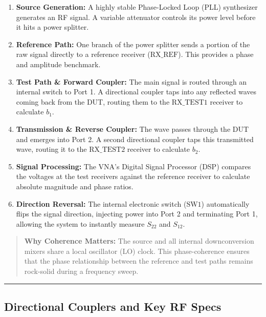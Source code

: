 \documentclass[
]{article}
\providecommand{\tightlist}{%
  \setlength{\itemsep}{0pt}\setlength{\parskip}{0pt}}
\begin{document}
\begin{enumerate}
\def\labelenumi{\arabic{enumi}.}
\tightlist
\item
  \textbf{Source Generation:} A highly stable Phase-Locked Loop (PLL)
  synthesizer generates an RF signal. A variable attenuator controls its
  power level before it hits a power splitter.
\item
  \textbf{Reference Path:} One branch of the power splitter sends a
  portion of the raw signal directly to a reference receiver
  (\(\text{RX\_REF}\)). This provides a phase and amplitude benchmark.
\item
  \textbf{Test Path \& Forward Coupler:} The main signal is routed
  through an internal switch to Port 1. A directional coupler taps into
  any reflected waves coming back from the DUT, routing them to the
  \(\text{RX\_TEST1}\) receiver to calculate \(b_1\).
\item
  \textbf{Transmission \& Reverse Coupler:} The wave passes through the
  DUT and emerges into Port 2. A second directional coupler taps this
  transmitted wave, routing it to the \(\text{RX\_TEST2}\) receiver to
  calculate \(b_2\).
\item
  \textbf{Signal Processing:} The VNA's Digital Signal Processor (DSP)
  compares the voltages at the test receivers against the reference
  receiver to calculate absolute magnitude and phase ratios.
\item
  \textbf{Direction Reversal:} The internal electronic switch
  (\(\text{SW1}\)) automatically flips the signal direction, injecting
  power into Port 2 and terminating Port 1, allowing the system to
  instantly measure \(S_{22}\) and \(S_{12}\).
\end{enumerate}

\begin{quote}
\textbf{Why Coherence Matters:} The source and all internal
downconversion mixers share a local oscillator (LO) clock. This
phase-coherence ensures that the phase relationship between the
reference and test paths remains rock-solid during a frequency sweep.
\end{quote}

\begin{center}\rule{0.5\linewidth}{0.5pt}\end{center}

\subsection{Directional Couplers and Key RF
Specs}\label{directional-couplers-and-key-rf-specs}
\end{document}
